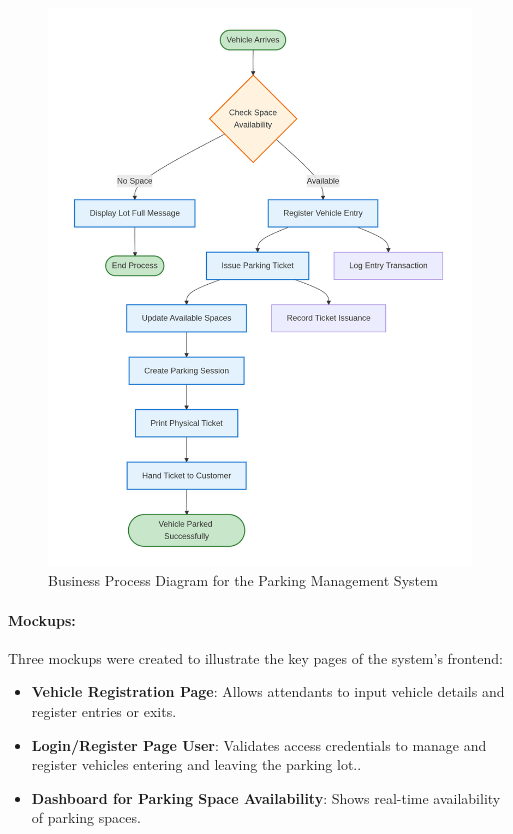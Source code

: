 \begin{figure}[ht]
    \centering
    \includegraphics[width=0.8\linewidth]{methods/images/Bussiness.png}
    \caption{Business Process Diagram for the Parking Management System}
\end{figure}

\paragraph{Mockups:}
Three mockups were created to illustrate the key pages of the system’s frontend:
\begin{itemize}
    \item \textbf{Vehicle Registration Page}: Allows attendants to input vehicle details and register entries or exits.
    \item \textbf{Login/Register Page User}: Validates access credentials to manage and register vehicles entering and leaving the parking lot..
    \item \textbf{Dashboard for Parking Space Availability}: Shows real-time availability of parking spaces.
\end{itemize}

